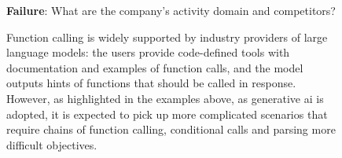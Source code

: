 \begin{figure}[H]
{\begin{minipage}{38em}
\vspace{0.3em}
\xmark \textbf{Failure}: What are the company's activity domain and competitors? 
\end{minipage}}
\caption[Examples of scenarios where the model a priori of user intent is not enough]{Function calling is widely supported by industry providers of large language models: the users provide code-defined tools with documentation and examples of function calls, and the model outputs hints of functions that should be called in response. However, as highlighted in the examples above, as generative \gls{ai} is adopted, it is expected to pick up more complicated scenarios that require chains of function calling, conditional calls and parsing more difficult objectives.}
\end{figure}